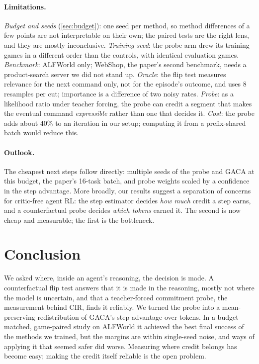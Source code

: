 \paragraph{Limitations.}
\emph{Budget and seeds} (\cref{sec:budget}): one seed per method, so method
differences of a few points are not interpretable on their own; the paired tests are the right lens,
and they are mostly inconclusive. \emph{Training seed}: the probe arm drew its training games in a
different order than the controls, with identical evaluation games. \emph{Benchmark}: ALFWorld only;
WebShop, the paper's second benchmark, needs a product-search server we did not stand up.
\emph{Oracle}: the flip test measures relevance for the next command only, not for the episode's
outcome, and uses 8 resamples per cut; importance is a difference of two noisy rates. \emph{Probe}: as a
likelihood ratio under teacher forcing, the probe can credit a segment that makes the eventual command
\emph{expressible} rather than one that decides it. \emph{Cost}: the probe adds about 40\% to an iteration
in our setup; computing it from a prefix-shared batch would reduce this.

\paragraph{Outlook.}
The cheapest next steps follow directly: multiple seeds of the probe and GACA at this budget, the
paper's 16-task batch, and probe weights scaled by a confidence in the step advantage. More broadly, our
results suggest a separation of concerns for critic-free agent RL: the step estimator decides
\emph{how much} credit a step earns, and a counterfactual probe decides \emph{which tokens} earned it.
The second is now cheap and measurable; the first is the bottleneck.

\section{Conclusion}
We asked where, inside an agent's reasoning, the decision is made. A counterfactual flip test answers
that it is made in the reasoning, mostly not where the model is uncertain, and that a teacher-forced
commitment probe, the measurement behind CIR, finds it reliably. We turned the probe into a
mean-preserving redistribution of GACA's step advantage over tokens. In a budget-matched, game-paired
study on ALFWorld it achieved the best final success of the methods we trained, but the margins are
within single-seed noise, and ways of applying it that seemed safer did worse. Measuring where credit
belongs has become easy; making the credit itself reliable is the open problem.
